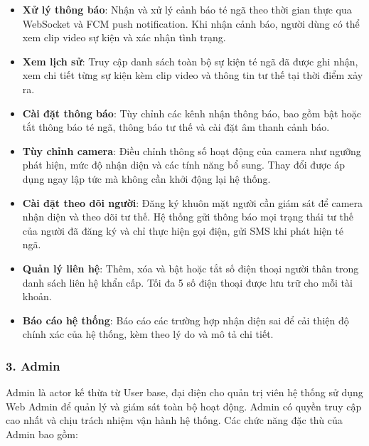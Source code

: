 \begin{itemize}[leftmargin=1.5cm]
  \item \textbf{Xử lý thông báo}: Nhận và xử lý cảnh báo té ngã
        theo thời gian thực qua WebSocket và FCM push notification.
        Khi nhận cảnh báo, người dùng có thể xem clip video sự
        kiện và xác nhận tình trạng.
  \item \textbf{Xem lịch sử}: Truy cập danh sách toàn bộ sự kiện
        té ngã đã được ghi nhận, xem chi tiết từng sự kiện kèm
        clip video và thông tin tư thế tại thời điểm xảy ra.
  \item \textbf{Cài đặt thông báo}: Tùy chỉnh các kênh nhận thông
        báo, bao gồm bật hoặc tắt thông báo té ngã, thông báo tư
        thế và cài đặt âm thanh cảnh báo.
  \item \textbf{Tùy chỉnh camera}: Điều chỉnh thông số hoạt động
        của camera như ngưỡng phát hiện, mức độ nhận diện và các
        tính năng bổ sung. Thay đổi được áp dụng ngay lập tức
        mà không cần khởi động lại hệ thống.
  \item \textbf{Cài đặt theo dõi người}: Đăng ký khuôn mặt người
        cần giám sát để camera nhận diện và theo dõi tư thế. Hệ
        thống gửi thông báo mọi trạng thái tư thế của người đã
        đăng ký và chỉ thực hiện gọi điện, gửi SMS khi phát hiện
        té ngã.
  \item \textbf{Quản lý liên hệ}: Thêm, xóa và bật hoặc tắt số
        điện thoại người thân trong danh sách liên hệ khẩn cấp.
        Tối đa 5 số điện thoại được lưu trữ cho mỗi tài khoản.
  \item \textbf{Báo cáo hệ thống}: Báo cáo các trường hợp nhận
        diện sai để cải thiện độ chính xác của hệ thống, kèm theo
        lý do và mô tả chi tiết.
\end{itemize}

\subsubsection{3. Admin}

Admin là actor kế thừa từ User base, đại diện cho quản trị viên
hệ thống sử dụng Web Admin để quản lý và giám sát toàn bộ hoạt
động. Admin có quyền truy cập cao nhất và chịu trách nhiệm vận
hành hệ thống. Các chức năng đặc thù của Admin bao gồm:

